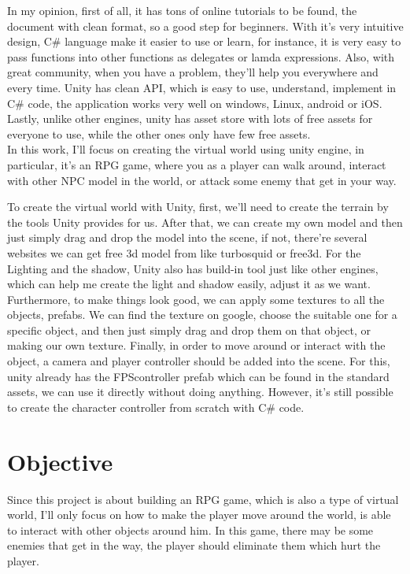 \documentclass[a4paper, 13pt]{extarticle}
\begin{document}
 In my opinion, first of all, it has tons of online tutorials to be found, the document with clean format, so a good step for beginners. With it's very intuitive design, C\# language make it easier to use or learn, for instance, it is very easy to pass functions into other functions as delegates or lamda expressions. Also, with great community, when you have a problem, they'll help you everywhere and every time. Unity has clean API, which is easy to use, understand, implement in C\# code, the application works very well on windows, Linux, android or iOS. Lastly, unlike other engines, unity has asset store with lots of free assets for everyone to use, while the other ones only have few free assets. \\[0.35cm]In this work, I'll focus on creating the virtual world using unity engine, in particular, it's an RPG game, where you as a player can walk around, interact with other NPC model in the world, or attack some enemy that get in your way. 
  

 To create the virtual world with Unity, first, we'll need to create the terrain by the tools Unity provides for us. After that, we can create my own model and then just simply drag and drop the model into the scene, if not, there're several websites we can get free 3d model from like turbosquid or free3d. For the Lighting and the shadow, Unity also has build-in tool just like other engines, which can help me create the light and shadow easily, adjust it as we want. Furthermore, to make things look good, we can apply some textures to all the objects, prefabs. We can find the texture on google, choose the suitable one for a specific object, and then just simply drag and drop them on that object, or making our own texture. Finally, in order to move around or interact with the object, a camera and player controller should be added into the scene. For this, unity already has the FPScontroller prefab which can be found in the standard assets, we can use it directly without doing anything. However, it's still possible to create the character controller from scratch with C\# code.
 \section{\Large Objective} 
 	Since this project is about building an RPG game, which is also a type of virtual world, I'll only focus on how to make the player move around the world, is able to interact with other objects around him. In this game, there may be some enemies that get in the way, the player should eliminate them which hurt the player. 
\end{document}
